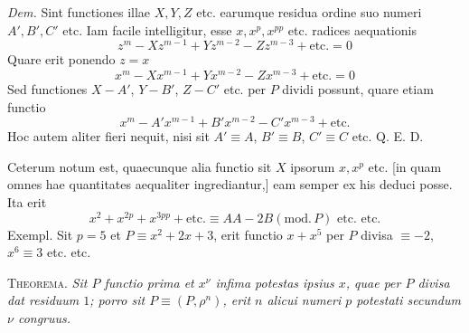 \emph{Dem.} Sint functiones illae $X,Y,Z$ etc. earumque residua ordine suo numeri $A',B',C'$ etc. Iam facile intelligitur, esse $x,x^p,x^{pp}$ etc. radices aequationis
\[
z^m-Xz^{m-1}+Yz^{m-2}-Zz^{m-3}+\text{etc.}=0
\]
Quare erit ponendo $z=x$
\[
x^m-Xx^{m-1}+Yx^{m-2}-Zx^{m-3}+\text{etc.}=0
\]
Sed functiones $X-A'$, $Y-B'$, $Z-C'$ etc. per $P$ dividi possunt, quare etiam functio
\[
x^m-A'x^{m-1}+B'x^{m-2}-C'x^{m-3}+\text{etc.}
\]
Hoc autem aliter fieri nequit, nisi sit $A'\equiv A$, $B'\equiv B$, $C'\equiv C$ etc. Q. E. D.

Ceterum notum est, quaecunque alia functio sit $X$ ipsorum $x,x^p$ etc. [in quam omnes hae quantitates aequaliter ingrediantur,] eam semper ex his deduci posse. Ita erit
%
\[
x^2+x^{2p}+x^{3pp}+\text{etc.}\equiv AA-2B(\mathrm{mod.}\,P)\text{ etc. etc.}
\]
Exempl. Sit $p=5$ et $P\equiv x^2+2x+3$, erit functio $x+x^5$ per $P$ divisa $\equiv-2$, $x^6\equiv3$ etc. etc.

\textsc{Theorema.} \emph{Sit $P$ functio prima et $x^\nu$ infima potestas ipsius $x$, quae per $P$ divisa dat residuum $1$; porro sit $P\equiv(P,\rho^n)$, erit $n$ alicui numeri $p$ potestati secundum $\nu$ congruus.}


